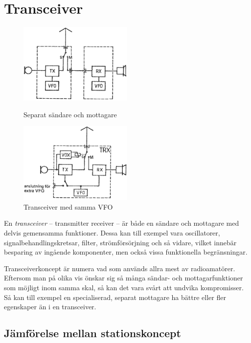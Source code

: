 \section{Transceiver}

\begin{figure}
  \includegraphics[width=0.5\textwidth]{images/cropped_pdfs/bild_2_5-09.pdf}
  \caption{Separat sändare och mottagare}
  \label{fig:bildII5-9}

  \includegraphics[width=0.5\textwidth]{images/cropped_pdfs/bild_2_5-10.pdf}
  \caption{Transceiver med samma VFO}
  \label{fig:bildII5-10}
\end{figure}

En \emph{transceiver} -- transmitter receiver -- är både en sändare och
mottagare med delvis gemensamma funktioner.
Dessa kan till exempel vara oscillatorer, signalbehandlingskretsar, filter,
strömförsörjning och så vidare, vilket innebär besparing av ingående
komponenter, men också vissa funktionella begränsningar.

Transceiverkoncept är numera vad som används allra mest av radioamatörer.
Eftersom man på olika vis önskar sig så många sändar- och mottagarfunktioner
som möjligt inom samma skal, så kan det vara svårt att undvika kompromisser.
Så kan till exempel en specialiserad, separat mottagare ha bättre eller fler
egenskaper än i en transceiver.

\subsection{Jämförelse mellan stationskoncept}

